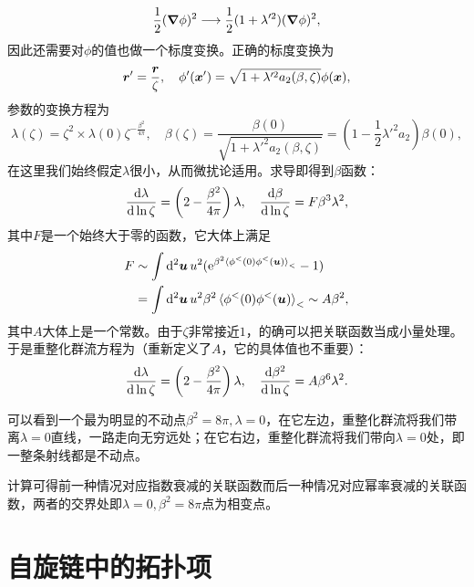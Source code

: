 \documentclass[hyperref, UTF8, a4paper]{ctexart}
\newcommand*{\ee}{\mathrm{e}}
\begin{document}
\[
    \frac{1}{2} (\grad{\phi})^2 \longrightarrow \frac{1}{2} (1 + \lambda'^2) (\grad{\phi})^2,
\]
因此还需要对$\phi$的值也做一个标度变换。正确的标度变换为
\[
    \vb*{r}' = \frac{\vb*{r}}{\zeta}, \quad \phi'(\vb*{x}') = \sqrt{1 + \lambda'^2 a_2(\beta, \zeta)} \phi(\vb*{x}),
\]
参数的变换方程为
\[
    \lambda(\zeta) = \zeta^2 \times \lambda(0) \zeta^{-\frac{\beta^2}{4\pi}}, \quad \beta(\zeta) = \frac{\beta(0)}{\sqrt{1 + \lambda'^2 a_2(\beta, \zeta)}} = (1 - \frac{1}{2} \lambda'^2 a_2) \beta(0),
\]
在这里我们始终假定$\lambda$很小，从而微扰论适用。求导即得到$\beta$函数：
\[
    \dv{\lambda}{\ln \zeta} = \left( 2 - \frac{\beta^2}{4\pi} \right) \lambda, \quad \dv{\beta}{\ln \zeta} = F \beta^3 \lambda^2,
\]
其中$F$是一个始终大于零的函数，它大体上满足
\[
    \begin{aligned}
        F &\sim \int \dd[2]{\vb*{u}} u^2 (\ee^{\beta^2 \expval*{\phi^<(0) \phi^<(\vb*{u})}_<} - 1) \\
        &= \int \dd[2]{\vb*{u}} u^2 \beta^2 \expval*{\phi^<(0) \phi^<(\vb*{u})}_< \sim A \beta^2,
    \end{aligned}
\]
其中$A$大体上是一个常数。由于$\zeta$非常接近$1$，的确可以把关联函数当成小量处理。
于是重整化群流方程为（重新定义了$A$，它的具体值也不重要）：
\begin{equation}
    \dv{\lambda}{\ln \zeta} = \left( 2 - \frac{\beta^2}{4\pi} \right) \lambda, \quad \dv{\beta^2}{\ln \zeta} = A \beta^6 \lambda^2.
\end{equation}


可以看到一个最为明显的不动点$\beta^2=8 \pi, \lambda=0$，在它左边，重整化群流将我们带离$\lambda=0$直线，一路走向无穷远处；在它右边，重整化群流将我们带向$\lambda=0$处，即一整条射线都是不动点。

计算可得前一种情况对应指数衰减的关联函数而后一种情况对应幂率衰减的关联函数，两者的交界处即$\lambda=0, \beta^2=8\pi$点为相变点。

\section{自旋链中的拓扑项}




\end{document}
